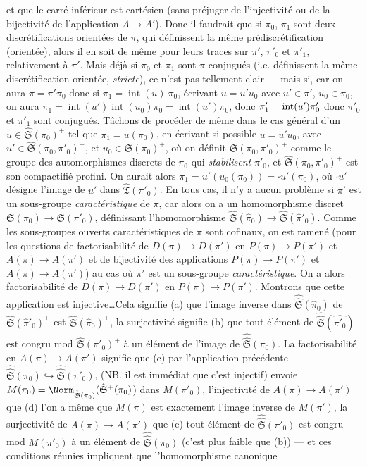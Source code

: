 et que le carré inférieur est cartésien (sans préjuger de l'injectivité ou de la bijectivité de l'application $A\to A'$).  Donc il faudrait que si $\pi_0$, $\pi_1$ sont deux discrétifications orientées de $\pi$, qui définissent la même prédiscrétification (orientée), alors il en soit de même pour leurs traces sur $\pi'$, $\pi'_0$ et $\pi'_1$, relativement à $\pi'$. Mais déjà si $\pi_0$ et $\pi_1$ sont $\pi$-conjugués (i.e. définissent la même discrétification orientée, \emph{stricte}), ce n'est pas tellement clair --- mais si, car on aura $\pi=\pi' \pi_0$ donc si $\pi_1= {\operatorname{int}}(u)\ \pi_0$, écrivant $u=u'u_0$ avec $u'\in\pi'$, $u_0\in\pi_0$, on aura $\pi_1={\operatorname{int}}(u'){\operatorname{int}}(u_0)\pi_0={\operatorname{int}}(u')\pi_0$, donc $\pi'_1={\rm int}(u')\pi'_0$ donc $\pi'_0$ et $\pi'_1$ sont conjugués. Tâchons de procéder de même dans le cas général d'un $u\in\hat{\mathfrak{S}}(\pi_0)^+$ tel que $\pi_1=u(\pi_0)$, en écrivant si possible $u=u'u_0$, avec $u'\in\hat{\mathfrak{S}}(\pi_0,\pi'_0)^+$, et $u_0\in\mathfrak{S}(\pi_0)^+$, où on définit $\mathfrak{S}(\pi_0,\pi'_0)^+$ comme le groupe des automorphismes discrets de $\pi_0$ qui \emph{stabilisent} $\pi'_0$, et $\hat{\mathfrak{S}}(\pi_0,\pi'_0)^+$ est son compactifié profini.  On aurait alors $\pi_1= u'(u_0(\pi_0))=\cdot u'(\pi_0)$, où $\cdot u'$ désigne l'image de $u'$ dans $\hat{\mathfrak{T}}(\pi'_0)$. En tous cas, il n'y a aucun problème si $\pi'$ est un sous-groupe \emph{caractéristique} de $\pi$, car alors on a un homomorphisme discret $\mathfrak{S}(\pi_0)\to\mathfrak{S}(\pi'_0)$, définissant l'homomorphisme  $\hat{\mathfrak{S}}(\hat\pi_0)\to\hat{\mathfrak{S}}(\hat\pi'_0)$. Comme les sous-groupes ouverts caractéristiques de $\pi$ sont cofinaux, on est ramené (pour les questions de factorisabilité de $D(\pi)\to D(\pi')$ en $P(\pi)\to P(\pi')$ et $A(\pi)\to A(\pi')$ et de bijectivité des applications $P(\pi)\to P(\pi')$ et $A(\pi)\to A(\pi')$) au cas où $\pi'$ est un sous-groupe \emph{caractéristique}. On a alors factorisabilité de $D(\pi)\to D(\pi')$ en $P(\pi)\to P(\pi')$. Montrons que cette application est injective\dots Cela signifie (a) que l'image inverse dans $\hat{\hat{\mathfrak{S}}}(\hat\pi_0)$ de $\hat{\mathfrak{S}}(\hat\pi'_0)^+$ est $\hat{\mathfrak{S}}(\hat\pi_0)^+$, la surjectivité signifie (b) que tout élément de $\hat{\hat{\mathfrak{S}}}(\hat{\pi'_0})$ est congru mod $\hat{\mathfrak{S}}(\pi'_0)^+$ à un élément de l'image de $\hat{\hat{\mathfrak{S}}}(\pi_0)$. La factorisabilité en $A(\pi)\to A(\pi')$ signifie que (c) par l'application précédente $\hat{\hat{\mathfrak{S}}}(\pi_0)\hookrightarrow \hat{\hat{\mathfrak{S}}}(\pi'_0)$, (NB. il est immédiat que c'est injectif) envoie $M(\pi_0)={\Norm}_{\hat{\hat{\mathfrak{S}}}(\pi_0)}(\hat{\mathfrak{S}}^+(\pi_0)$) dans $M(\pi'_0)$, l'injectivité de $A(\pi) \to A(\pi')$ que (d) l'on a même que $M(\pi)$ est exactement l'image inverse de $M(\pi')$, la surjectivité de $A(\pi)\to A(\pi')$ que (e) tout élément de $\hat{\hat{\mathfrak{S}}}(\pi'_0)$ est congru mod $M(\pi'_0)$ à un élément de $\hat{\hat{\mathfrak{S}}}(\pi_0)$ (c'est plus faible que (b)) --- et ces conditions réunies impliquent que l'homomorphisme canonique 
